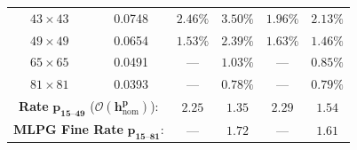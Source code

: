 \documentclass[VANCOUVER]{USG}
\begin{document}
\begin{table}[!t]
{\begin{tabular}{cccccc}
            $43 \times 43$                                                                                    & 0.0748                                    & $\mathbf{2.46\%}$                                 & $3.50\%$                                 & $\mathbf{1.96\%}$ & $2.13\%$           \\
            $49 \times 49$                                                                                    & 0.0654                                    & $\mathbf{1.53\%}$                                 & $2.39\%$                                 & $1.63\%$          & $\mathbf{1.46\%}$  \\
            $65 \times 65$                                                                                    & 0.0491                                    & ---                                               & $1.03\%$                                 & ---               & $0.85\%$           \\
            $81 \times 81$                                                                                    & 0.0393                                    & ---                                               & $0.78\%$                                 & ---               & $0.79\%$           \\
            \midrule
            \multicolumn{2}{c}{\textbf{Rate} $\boldsymbol{p_{15\text{--}49}}$ ($\boldsymbol{\mathcal{O}(h_{\mathrm{nom}}^p)}$):} & $\mathbf{2.25}$                  & $1.35$                                            & $\mathbf{2.29}$   & $1.54$             \\
            \multicolumn{2}{c}{\textbf{MLPG Fine Rate} $\boldsymbol{p_{15\text{--}81}}$:}                                         & ---                              & $\mathbf{1.72}$                                   & ---               & $\mathbf{1.61}$    \\
            \bottomrule
        \end{tabular}
    }
\end{table}
\end{document}
